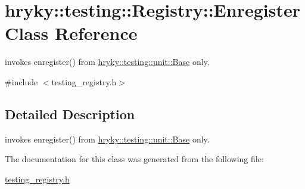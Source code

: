 \hypertarget{classhryky_1_1testing_1_1_registry_1_1_enregister}{\section{hryky\-:\-:testing\-:\-:Registry\-:\-:Enregister Class Reference}
\label{classhryky_1_1testing_1_1_registry_1_1_enregister}
}


invokes enregister() from \hyperlink{classhryky_1_1testing_1_1unit_1_1_base}{hryky\-::testing\-::unit\-::\-Base} only.  




{\ttfamily \#include $<$testing\-\_\-registry.\-h$>$}



\subsection{Detailed Description}
invokes enregister() from \hyperlink{classhryky_1_1testing_1_1unit_1_1_base}{hryky\-::testing\-::unit\-::\-Base} only. 

The documentation for this class was generated from the following file\-:\begin{DoxyCompactItemize}
\item 
\hyperlink{testing__registry_8h}{testing\-\_\-registry.\-h}\end{DoxyCompactItemize}
